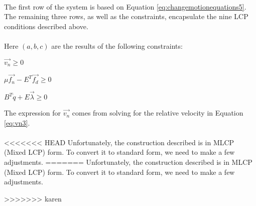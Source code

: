 {\begin{equation}
\begin{array}{cc}
\begin{matrix}
\end{matrix}
\end{array}
\end{equation}
The first row of the system is based on Equation \ref{eq:changemotionequations5}. The remaining three rows, as well as the constraints, encapsulate the nine LCP conditions described above.
\\
\\
Here $(a, b, c)$ are the results of the following constraints: 
\begin{packed_item}
\item $\vec{v_n} \geq 0$
\item $\mu\vec{f_n} - E^T\vec{f_d} \geq 0$
\item $B^T\dot{q} + E\vec{\lambda} \geq 0$
\end{packed_item}
The expression for $\vec{v_n}$ comes from solving for the relative velocity in Equation \ref{eq:vn3}.
\\
\\
<<<<<<< HEAD
Unfortunately, the construction described is in MLCP (Mixed LCP) form. To convert it to standard form, we need to make a few adjustments.
=======
Unfortunately, the construction described is in MLCP (Mixed LCP)
form. To convert it to standard form, we need to make a few
adjustments.
}
>>>>>>> karen
